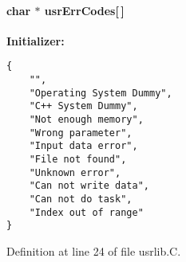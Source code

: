 \paragraph{\setlength{\rightskip}{0pt plus 5cm}char $\ast$ usr\-Err\-Codes[$\,$]}\hfill

{\bf Initializer:}\small\begin{verbatim}{
    "",
    "Operating System Dummy",
    "C++ System Dummy",
    "Not enough memory",
    "Wrong parameter",
    "Input data error",
    "File not found",
    "Unknown error",
    "Can not write data",
    "Can not do task",
    "Index out of range"
}\end{verbatim}\normalsize 


Definition at line 24 of file usrlib.C.
